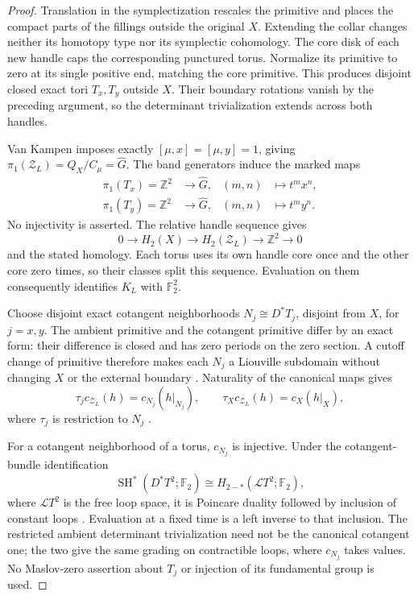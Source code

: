 \documentclass[11pt]{amsart}
\theoremstyle{definition}
\theoremstyle{remark}
\newcommand{\Z}{\mathbb Z}
\newcommand{\Ftwo}{\mathbb F_2}
\begin{document}
\begin{proof}
Translation in the symplectization rescales the primitive and
places the compact parts of the fillings outside the original
$X$. Extending the collar changes neither its homotopy type nor
its symplectic cohomology. The core disk of each new handle caps
the corresponding punctured torus. Normalize its primitive to
zero at its single positive end, matching the core primitive.
This produces disjoint closed exact tori $T_x,T_y$ outside $X$.
Their boundary rotations vanish by the preceding argument, so the
determinant trivialization extends across both handles.

Van Kampen imposes exactly $[\mu,x]=[\mu,y]=1$, giving
$\pi_1(\mathcal Z_L)=Q_X/C_\mu=\widehat G$.
The band generators induce the marked maps
\[
\begin{aligned}
 \pi_1(T_x)=\Z^2&\longrightarrow\widehat G,
       &(m,n)&\longmapsto t^m x^n,\\
 \pi_1(T_y)=\Z^2&\longrightarrow\widehat G,
       &(m,n)&\longmapsto t^m y^n.
\end{aligned}
\]
No injectivity is asserted. The relative handle sequence gives
\[
 0\longrightarrow H_2(X)\longrightarrow H_2(\mathcal Z_L)
       \longrightarrow\Z^2\longrightarrow0
\]
and the stated homology. Each torus uses its own handle core once
and the other core zero times, so their classes split this sequence.
Evaluation on them consequently identifies $K_L$ with $\Ftwo^2$.

Choose disjoint exact cotangent neighborhoods
$N_j\cong D^*T_j$, disjoint from $X$, for $j=x,y$.
The ambient primitive and the cotangent primitive differ by an
exact form: their difference is closed and has zero periods on
the zero section. A cutoff change of primitive therefore makes
each $N_j$ a Liouville subdomain without changing $X$ or the
external boundary \cite[Example 9.1 and Lemma 9.2]{Rit13}.
Naturality of the canonical maps gives
\begin{equation}\label{eq:exact-transfer-naturality}
 \tau_j c_{\mathcal Z_L}(h)=c_{N_j}(h|_{N_j}),
 \qquad
 \tau_X c_{\mathcal Z_L}(h)=c_X(h|_X),
\end{equation}
where $\tau_j$ is restriction to $N_j$
\cite[Theorem 9.5]{Rit13}.

For a cotangent neighborhood of a torus, $c_{N_j}$ is injective.
Under the cotangent-bundle identification
\[
 \operatorname{SH}^*(D^*T^2;\Ftwo)
                    \cong H_{2-*}(\mathcal L T^2;\Ftwo),
\]
where $\mathcal L T^2$ is the free loop space, it is Poincare
duality followed by inclusion of constant loops
\cite[Section 14, Remark 14.1]{Rit13}. Evaluation at a fixed
time is a left inverse to that inclusion. The restricted ambient
determinant trivialization need not be the canonical cotangent
one; the two give the same grading on contractible loops, where
$c_{N_j}$ takes values. No Maslov-zero assertion about $T_j$ or
injection of its fundamental group is used.


\end{proof}
\end{document}
